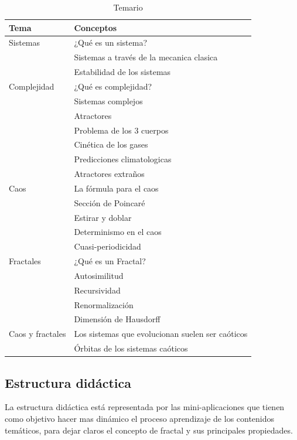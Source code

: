 \documentclass[letterpaper, 11pt, oneside]{article}
\theoremstyle{definition}
\theoremstyle{remark}
\begin{document}
\begin{table}[htb]
\centering
\begin{tabular}[ht]{ p{4cm} | p{7cm}  }
\toprule 
\rowcolor[gray]{0.9}Tema & Conceptos \\
\midrule Sistemas & ¿Qué es un sistema? \\
\midrule & Sistemas a través de la mecanica clasica \\
\midrule & Estabilidad de los sistemas \\
\bottomrule Complejidad & ¿Qué es complejidad? \\
\midrule & Sistemas complejos \\
\midrule & Atractores \\
\midrule & Problema de los 3 cuerpos \\
\midrule & Cinética de los gases \\
\midrule & Predicciones climatologicas \\
\midrule & Atractores extraños \\
\bottomrule Caos & La fórmula para el caos \\
\midrule & Sección de Poincaré \\
\midrule & Estirar y doblar \\
\midrule & Determinismo en el caos \\
\midrule & Cuasi-periodicidad \\
\bottomrule Fractales & ¿Qué es un Fractal? \\
\midrule & Autosimilitud \\
\midrule & Recursividad \\
\midrule & Renormalización \\
\midrule & Dimensión de Hausdorff \\
\bottomrule Caos y fractales & Los sistemas que evolucionan suelen ser caóticos \\
\midrule & Órbitas de los sistemas caóticos \\
\bottomrule
\end{tabular}
\caption{Temario}
\label{Temario}
\end{table}

\clearpage
\subsection{Estructura didáctica}

La estructura didáctica está representada por las mini-aplicaciones que tienen como objetivo hacer mas dinámico el proceso aprendizaje de los contenidos temáticos, para dejar claros el concepto de fractal y sus principales propiedades.
\end{document}
